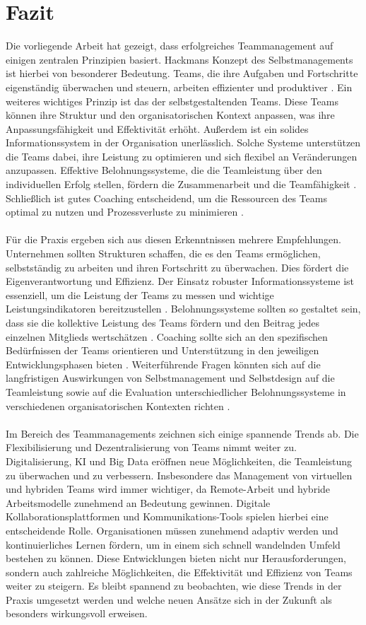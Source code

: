 \chapter*{Fazit}
Die vorliegende Arbeit hat gezeigt, dass erfolgreiches Teammanagement auf einigen zentralen Prinzipien basiert. Hackmans Konzept des Selbstmanagements ist hierbei von besonderer Bedeutung. Teams, die ihre Aufgaben und Fortschritte eigenständig überwachen und steuern, arbeiten effizienter und produktiver \cite{Hackman}. Ein weiteres wichtiges Prinzip ist das der selbstgestaltenden Teams. Diese Teams können ihre Struktur und den organisatorischen Kontext anpassen, was ihre Anpassungsfähigkeit und Effektivität erhöht. Außerdem ist ein solides Informationssystem in der Organisation unerlässlich. Solche Systeme unterstützen die Teams dabei, ihre Leistung zu optimieren und sich flexibel an Veränderungen anzupassen. Effektive Belohnungssysteme, die die Teamleistung über den individuellen Erfolg stellen, fördern die Zusammenarbeit und die Teamfähigkeit \cite{Hackman}. Schließlich ist gutes Coaching entscheidend, um die Ressourcen des Teams optimal zu nutzen und Prozessverluste zu minimieren \cite{nuernbergerCoaching}.\\\\ 
Für die Praxis ergeben sich aus diesen Erkenntnissen mehrere Empfehlungen. Unternehmen sollten Strukturen schaffen, die es den Teams ermöglichen, selbstständig zu arbeiten und ihren Fortschritt zu überwachen. Dies fördert die Eigenverantwortung und Effizienz. Der Einsatz robuster Informationssysteme ist essenziell, um die Leistung der Teams zu messen und wichtige Leistungsindikatoren bereitzustellen \cite{Hackman}. Belohnungssysteme sollten so gestaltet sein, dass sie die kollektive Leistung des Teams fördern und den Beitrag jedes einzelnen Mitglieds wertschätzen \cite{Hackman}. Coaching sollte sich an den spezifischen Bedürfnissen der Teams orientieren und Unterstützung in den jeweiligen Entwicklungsphasen bieten \cite{Hackman}. Weiterführende Fragen könnten sich auf die langfristigen Auswirkungen von Selbstmanagement und Selbstdesign auf die Teamleistung sowie auf die Evaluation unterschiedlicher Belohnungssysteme in verschiedenen organisatorischen Kontexten richten \cite{Hackman}.\\\\
Im Bereich des Teammanagements zeichnen sich einige spannende Trends ab. Die Flexibilisierung und Dezentralisierung von Teams nimmt weiter zu. Digitalisierung, KI und Big Data eröffnen neue Möglichkeiten, die Teamleistung zu überwachen und zu verbessern. Insbesondere das Management von virtuellen und hybriden Teams wird immer wichtiger, da Remote-Arbeit und hybride Arbeitsmodelle zunehmend an Bedeutung gewinnen. Digitale Kollaborationsplattformen und Kommunikations-Tools spielen hierbei eine entscheidende Rolle. Organisationen müssen zunehmend adaptiv werden und kontinuierliches Lernen fördern, um in einem sich schnell wandelnden Umfeld bestehen zu können. Diese Entwicklungen bieten nicht nur Herausforderungen, sondern auch zahlreiche Möglichkeiten, die Effektivität und Effizienz von Teams weiter zu steigern. Es bleibt spannend zu beobachten, wie diese Trends in der Praxis umgesetzt werden und welche neuen Ansätze sich in der Zukunft als besonders wirkungsvoll erweisen.

